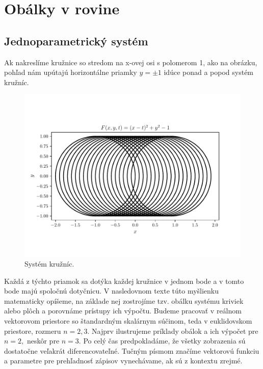\chapter{Obálky v rovine}
\label{kap:kapitola1} %

\section{Jednoparametrický systém}
Ak nakreslíme kružnice so stredom na x-ovej osi s polomerom 1, ako na obrázku, pohľad nám upútajú horizontálne priamky $y = \pm 1$ idúce ponad a popod systém kružníc.

\begin{figure}[h]
	\centering
	\includegraphics[trim={0 1.65cm 0 2cm},clip]{images/system.pdf}
	\caption[Systém kružníc.]{Systém kružníc.}
	\label{fig:system}
\end{figure}

Každá z týchto priamok sa dotýka každej kružnice v jednom bode a v tomto bode majú spoločnú dotyčnicu. V nasledovnom texte túto myšlienku matematicky opíšeme, na základe nej zostrojíme tzv. obálku systému kriviek alebo plôch a porovnáme prístupy ich výpočtu. Budeme pracovať v reálnom vektorovom priestore so štandardným skalárnym súčinom, teda v euklidovskom priestore, rozmeru $n = 2, 3.$ Najprv ilustrujeme príklady obálok a ich výpočet pre $ n = 2,$ neskôr pre $n = 3.$ Po celý čas predpokladáme, že všetky zobrazenia sú dostatočne veľakrát diferencovateľné. Tučným písmom značíme vektorovú funkciu a parametre pre prehľadnosť zápisov vynechávame, ak sú z kontextu zrejmé.

